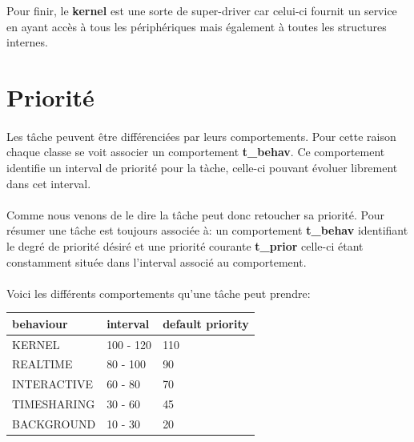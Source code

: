 \documentclass[10pt,a4wide]{article}
\begin{document}
Pour finir, le \textbf{kernel} est une sorte de super-driver car celui-ci
fournit un service en ayant acc\`es \`a tous les p\'eriph\'eriques mais
\'egalement \`a toutes les structures internes.

\section{Priorit\'e}

\paragraph{}

Les t\^ache peuvent \^etre diff\'erenci\'ees par leurs comportements. Pour
cette raison chaque classe se voit associer un comportement \textbf{t\_behav}.
Ce comportement identifie un interval de priorit\'e pour la t\`ache, celle-ci
pouvant \'evoluer librement dans cet interval.

\paragraph{}

Comme nous venons de le dire la t\^ache peut donc retoucher sa priorit\'e.
Pour r\'esumer une t\^ache est toujours associ\'ee \`a: un comportement
\textbf{t\_behav} identifiant le degr\'e de priorit\'e d\'esir\'e et
une priorit\'e courante \textbf{t\_prior} celle-ci \'etant constamment
situ\'ee dans l'interval associ\'e au comportement.

\paragraph{}

Voici les diff\'erents comportements qu'une t\^ache peut prendre:

\begin{center}

\begin{tabular}{|p{4cm}|p{4cm}|p{4cm}|}

\hline

\textbf{behaviour}	& \textbf{interval}	& \textbf{default priority} \\

\hline

KERNEL			& 100 - 120		& 110 \\

\hline

REALTIME		& 80 - 100		& 90 \\

\hline

INTERACTIVE		& 60 - 80		& 70 \\

\hline

TIMESHARING		& 30 - 60		& 45 \\

\hline

BACKGROUND		& 10 - 30		& 20 \\

\hline

\end{tabular}

\end{center}
\end{document}
